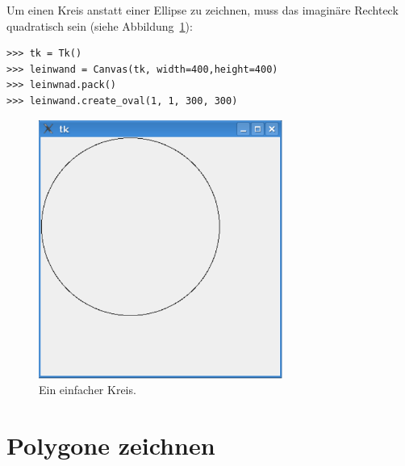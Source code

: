 \noindent
Um einen Kreis anstatt einer Ellipse zu zeichnen, muss das imaginäre Rechteck quadratisch sein (siehe Abbildung~\ref{fig40}):

\begin{Verbatim}[frame=single]
>>> tk = Tk()
>>> leinwand = Canvas(tk, width=400,height=400)
>>> leinwnad.pack()
>>> leinwand.create_oval(1, 1, 300, 300)
\end{Verbatim}

\begin{figure}
\begin{center}
\includegraphics[width=80mm]{images/figure40}
\end{center}
\caption{Ein einfacher Kreis.}\label{fig40}
\end{figure}

\section{Polygone zeichnen}

